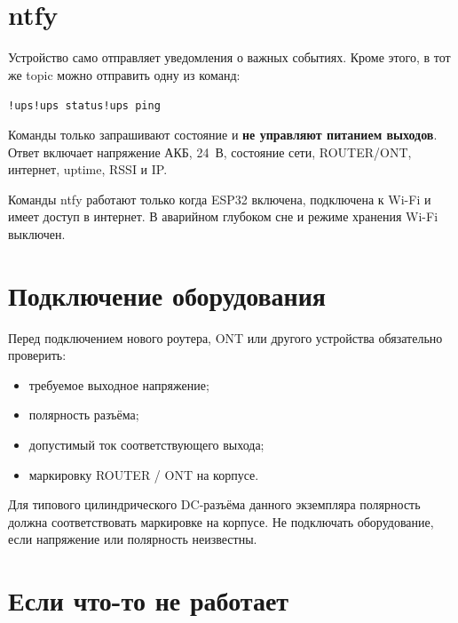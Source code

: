 \documentclass[10.5pt,a5paper]{article}
\begin{document}
\section{ntfy}

Устройство само отправляет уведомления о важных событиях. Кроме этого, в тот же topic можно отправить одну из команд:

\begin{center}
\texttt{!ups}\qquad \texttt{!ups status}\qquad \texttt{!ups ping}
\end{center}

Команды только запрашивают состояние и \textbf{не управляют питанием выходов}. Ответ включает напряжение АКБ, 24~В, состояние сети, ROUTER/ONT, интернет, uptime, RSSI и IP.

\begin{infobox}
Команды ntfy работают только когда ESP32 включена, подключена к Wi-Fi и имеет доступ в интернет. В аварийном глубоком сне и режиме хранения Wi-Fi выключен.
\end{infobox}

\section{Подключение оборудования}

Перед подключением нового роутера, ONT или другого устройства обязательно проверить:
\begin{itemize}
  \item требуемое выходное напряжение;
  \item полярность разъёма;
  \item допустимый ток соответствующего выхода;
  \item маркировку ROUTER / ONT на корпусе.
\end{itemize}

Для типового цилиндрического DC-разъёма данного экземпляра полярность должна соответствовать маркировке на корпусе. Не подключать оборудование, если напряжение или полярность неизвестны.

\section{Если что-то не работает}
\end{document}
